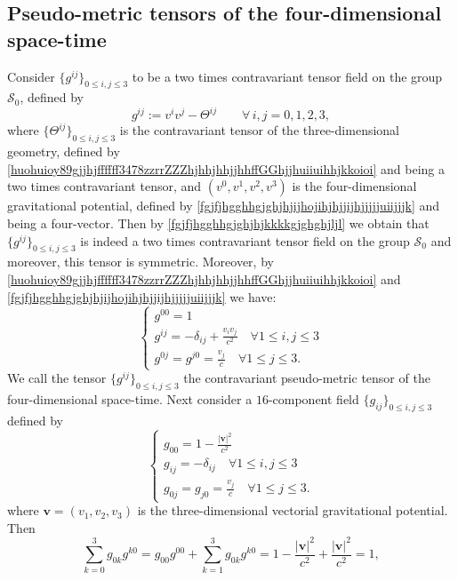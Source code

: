 \documentclass{article}
\theoremstyle{definition}
\theoremstyle{remark}
\renewcommand{\vec}[1]{\mathbf{#1}}
\newcommand{\er}{\eqref}
\newcommand{\er}{\eqref}
\begin{document}
\subsection{Pseudo-metric tensors of the four-dimensional space-time}
Consider $\{g^{ij}\}_{0\leq i,j\leq 3}$ to be a two times
contravariant tensor field on the group $\mathcal{S}_0$, defined by
\begin{equation}\label{hoyuiouigyfghgjh3478zzrrZZffGGjkkjojj}
g^{ij}:=v^iv^j-{\Theta}^{ij}\quad\quad\forall\,i,j=0,1,2,3,
\end{equation}
where $\{{\Theta}^{ij}\}_{0\leq i,j\leq 3}$ is the contravariant
tensor of the three-dimensional geometry, defined by
\er{huohuioy89gjjhjffffff3478zzrrZZZhjhhjhhjjhhffGGhjjhuiiuihhjkkoioi}
and being a two times contravariant tensor, and $(v^0,v^1,v^2,v^3)$
is the four-dimensional gravitational potential, defined by
\er{fgjfjhgghhgjghjhjijhojihjhjjijhjjjjjuiijjjk} and being a
four-vector. Then by \er{fgjfjhgghhgjghjhjkkkkgjghghjljl} we obtain
that $\{g^{ij}\}_{0\leq i,j\leq 3}$ is indeed a two times
contravariant tensor field on the group $\mathcal{S}_0$ and
moreover, this tensor is symmetric. Moreover, by
\er{huohuioy89gjjhjffffff3478zzrrZZZhjhhjhhjjhhffGGhjjhuiiuihhjkkoioi}
and \er{fgjfjhgghhgjghjhjijhojihjhjjijhjjjjjuiijjjk} we have:
\begin{equation}\label{hoyuiouigyfghgjh3478zzrrZZffGGjkkj}
\begin{cases}
g^{00}=1\\
g^{ij}=-\delta_{ij}+\frac{v_iv_j}{c^2}\quad\forall 1\leq i,j\leq 3\\
g^{0j}=g^{j0}=\frac{v_j}{c}\quad\forall 1\leq j\leq 3.
\end{cases}
\end{equation}
We call the tensor $\{g^{ij}\}_{0\leq i,j\leq 3}$ the contravariant
pseudo-metric tensor of the four-dimensional space-time. Next
consider a $16$-component field $\{g_{ij}\}_{0\leq i,j\leq 3}$
defined by
\begin{equation}\label{hoyuiouigyfg3478zzrrZZffGGhhjhj}
\begin{cases}
g_{00}=1-\frac{|\vec v|^2}{c^2}\\
g_{ij}=-\delta_{ij}\quad\forall 1\leq i,j\leq 3\\
g_{0j}=g_{j0}=\frac{v_j}{c}\quad\forall 1\leq j\leq 3.
\end{cases}
\end{equation}
where $\vec v=(v_1,v_2,v_3)$ is the three-dimensional vectorial
gravitational potential. Then
\begin{equation*}
\sum_{k=0}^{3}g_{0k}g^{k0}=g_{00}g^{00}+\sum_{k=1}^{3}g_{0k}g^{k0}=
1-\frac{|\vec v|^2}{c^2}+\frac{|\vec v|^2}{c^2}=1,
\end{equation*}
\end{document}
